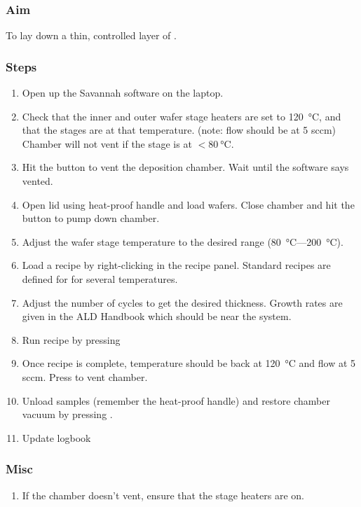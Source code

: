 \documentclass[12pt,a4paper]{report}
\begin{document}
\subsubsection{Aim}
To lay down a thin, controlled layer of .

\subsubsection{Steps}
\begin{enumerate}
\item Open up the Savannah software on the laptop.
\item Check that the inner and outer wafer stage heaters are set to \SI{120}{\degreeCelsius}, and that the stages
are at that temperature. (note:  flow should be at 5 sccm) Chamber will not vent if the stage is at $<\SI{80}{\degreeCelsius}$.
\item Hit the  button to vent the deposition chamber. Wait until the software says vented.
\item Open lid using heat-proof handle and load wafers. Close chamber and hit the  button to pump down chamber.
\item Adjust the wafer stage temperature to the desired range (\SI{80}{\degreeCelsius}---\SI{200}{\degreeCelsius}).
\item Load a recipe by right-clicking in the recipe panel. Standard recipes are defined for  for several temperatures.
\item Adjust the number of cycles to get the desired thickness. Growth rates are given in the ALD Handbook which should be near the system.
\item Run recipe by pressing 
\item Once recipe is complete, temperature should be back at \SI{120}{\degreeCelsius} and  flow at 5 sccm. Press  to vent chamber.
\item Unload samples (remember the heat-proof handle) and restore chamber vacuum by pressing .
\item Update logbook
\end{enumerate}

\subsubsection{Misc}
\begin{enumerate}
\item If the chamber doesn't vent, ensure that the stage heaters are on.
\end{enumerate}
\newpage
\end{document}
